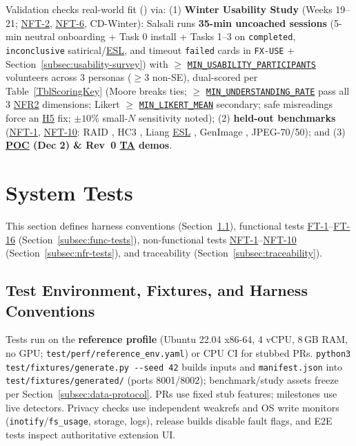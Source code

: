 \documentclass[12pt, titlepage]{article}
\newcommand{\MinUnderstandingRate}{\hyperref[const:MIN_UNDERSTANDING_RATE]{\texttt{MIN\_\allowbreak{}UNDERSTANDING\_\allowbreak{}RATE}}}
\newcommand{\MinUsabilityParticipants}{\hyperref[const:MIN_USABILITY_PARTICIPANTS]{\texttt{MIN\_\allowbreak{}USABILITY\_\allowbreak{}PARTICIPANTS}}}
\newcommand{\MinLikertMean}{\hyperref[const:MIN_LIKERT_MEAN]{\texttt{MIN\_\allowbreak{}LIKERT\_\allowbreak{}MEAN}}}
\newcommand{\ESL}{\hyperlink{vnv-acr-esl}{ESL}}
\newcommand{\POC}{\hyperlink{vnv-acr-poc}{POC}}
\newcommand{\TA}{\hyperlink{vnv-acr-ta}{TA}}
\begin{document}
Validation checks real-world fit (\cite{VerityProbState2026}) via: (1) \textbf{Winter Usability Study} (Weeks 19--21; \hyperref[test:NFT-2]{NFT-2}, \hyperref[test:NFT-6]{NFT-6}, CD-Winter): Salsali runs \textbf{35-min uncoached sessions} (5-min neutral onboarding + Task 0 install + Tasks 1--3 on \texttt{completed}, \texttt{inconclusive} satirical/\ESL{}, and timeout \texttt{failed} cards in \texttt{FX-USE} + Section~\ref{subsec:usability-survey}) with $\ge$ \MinUsabilityParticipants{} volunteers across 3 personas ($\ge 3$ non-SE), dual-scored per Table~\ref{TblScoringKey} (Moore breaks ties; $\ge$ \MinUnderstandingRate{} pass all 3 \hyperref[req:NFR2]{NFR2} dimensions; Likert $\ge$ \MinLikertMean{} secondary; safe misreadings force an \hyperref[haz:H5]{H5} fix; $\pm 10\%$ small-$N$ sensitivity noted); (2) \textbf{held-out benchmarks} (\hyperref[test:NFT-1]{NFT-1}, \hyperref[test:NFT-10]{NFT-10}: RAID \cite{RaidBenchmark2024}, HC3 \cite{HC3Guo2023}, Liang \ESL{} \cite{Liang2023ESL}, GenImage \cite{GenImage2023}, JPEG-70/50); and (3) \textbf{\POC{} (Dec 2) \& Rev~0 \TA{} demos}.

\section{System Tests}\label{sec:system-tests}

This section defines harness conventions (Section~\ref{subsec:harness}), functional tests \hyperref[test:FT-1]{FT-1}--\hyperref[test:FT-16]{FT-16} (Section~\ref{subsec:func-tests}), non-functional tests \hyperref[test:NFT-1]{NFT-1}--\hyperref[test:NFT-10]{NFT-10} (Section~\ref{subsec:nfr-tests}), and traceability (Section~\ref{subsec:traceability}).

\subsection{Test Environment, Fixtures, and Harness Conventions}\label{subsec:harness}

Tests run on the \textbf{reference profile} (Ubuntu 22.04 x86-64, 4 vCPU, 8\,GB RAM, no GPU; \texttt{test/\allowbreak{}perf/\allowbreak{}reference\_\allowbreak{}env.yaml}) or CPU CI for stubbed PRs. \texttt{python3 test/\allowbreak{}fixtures/\allowbreak{}generate.py -{}-seed 42} builds inputs and \texttt{manifest.json} into \texttt{test/\allowbreak{}fixtures/\allowbreak{}generated/} (ports 8001/8002); benchmark/study assets freeze per Section~\ref{subsec:data-protocol}. PRs use fixed stub features; milestones use live detectors. Privacy checks use independent weakrefs and OS write monitors (\texttt{inotify}/\texttt{fs\_usage}, storage, logs), release builds disable fault flags, and E2E tests inspect authoritative extension UI.
\end{document}

